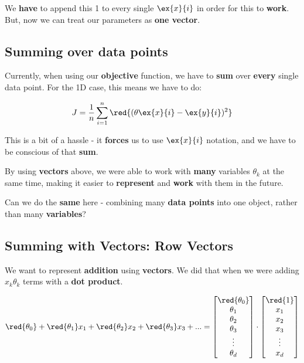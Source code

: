         We \textbf{have} to append this 1 to every single $\ex{x}{i}$ in order for this to \textbf{work}. But, now we can treat our parameters as \textbf{one vector}.
    
    \subsection{Summing over data points}
    
        Currently, when using our \textbf{objective} function, we have to \textbf{sum} over \textbf{every} single data point. For the 1D case, this means we have to do:
        
        \begin{equation}
            J = 
            \frac{1}{n}  \sum_{i=1}^n \red{(\theta \ex{x}{i}  - \ex{y}{i} )^2} 
        \end{equation}
        
        This is a bit of a hassle - it \textbf{forces} us to use $\ex{x}{i}$ notation, and we have to be conscious of that \textbf{sum}.
        
        By using \textbf{vectors} above, we were able to work with \textbf{many} variables $\theta_k$ at the same time, making it easier to \textbf{represent} and \textbf{work} with them in the future. 
        
        Can we do the \textbf{same} here - combining many \textbf{data points} into one object, rather than many \textbf{variables}?
    
    \subsection{Summing with Vectors: Row Vectors}
        
        We want to represent \textbf{addition} using \textbf{vectors}. We did that when we were adding $x_k\theta_k$ terms with a \textbf{dot product}.
        
        \begin{equation}
            \red{\theta_0} + \red{\theta_1}x_1 + \red{\theta_2}x_2 + \red{\theta_3}x_3 + ...
            =
            \begin{bmatrix}
              \red{\theta_0} \\ \theta_1 \\ \theta_2 \\ \theta_3 \\ \vdots \\ \theta_d
            \end{bmatrix}
            \cdot
            \begin{bmatrix}
              \red{1} \\ x_1 \\ x_2 \\ x_3 \\ \vdots \\ x_d
            \end{bmatrix}
        \end{equation}
        
